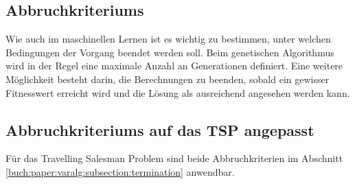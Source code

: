 %
%
%
%
\subsection{Abbruchkriteriums
\label{buch:paper:varalg:subsection:termination}}
Wie auch im maschinellen Lernen ist es wichtig zu bestimmen, unter 
welchen Bedingungen der Vorgang beendet werden soll. Beim 
genetischen Algorithmus wird in der Regel eine maximale Anzahl an 
Generationen definiert. Eine weitere Möglichkeit besteht darin, 
die Berechnungen zu beenden, sobald ein gewisser Fitnesswert erreicht 
wird und die Lösung als ausreichend angesehen werden kann.

\subsection{Abbruchkriteriums auf das TSP angepasst
\label{buch:paper:varalg:subsection:termination_tsp}}
Für das Travelling Salesman Problem sind beide Abbruchkriterien im 
Abschnitt \ref{buch:paper:varalg:subsection:termination} anwendbar.
